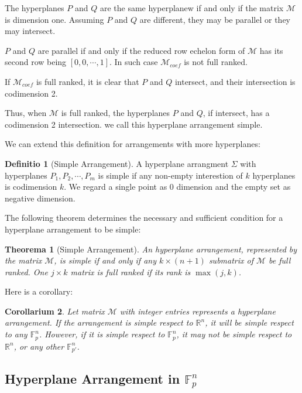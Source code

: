 \documentclass[12pt, a4paper]{article}
\newtheorem{theorem}{Theorema}[subsection]
\newtheorem{corollary}[theorem]{Corollarium}
\theoremstyle{definition}
\newtheorem{definition}{Definitio}[section]
\theoremstyle{remark}
\newcommand{\bb}[1]{\mathbb{#1}}
\begin{document}
The hyperplanes $P$ and $Q$ are the same hyperplanew if and only if the matrix $\mathcal{M}$ is dimension one. Assuming $P$ and $Q$ are different, they may be parallel or they may intersect. 

$P$ and $Q$ are parallel if and only if the reduced row echelon form of $\mathcal{M}$ has its second row being $[0, 0, \cdots, 1]$. In such case $\mathcal{M}_{coef}$ is not full ranked. 

If $\mathcal{M}_{coef}$ is full ranked, it is clear that $P$ and $Q$ intersect, and their intersection is codimension 2.

Thus, when $\mathcal{M}$ is full ranked, the hyperplanes $P$ and $Q$, if intersect, has a codimension 2 intersection. we call this hyperplane arrangement simple. 

We can extend this definition for arrangements with more hyperplanes:

\begin{definition}[Simple Arrangement]
A hyperplane arrangment $\Sigma$ with hyperplanes $P_1, P_2, \cdots, P_m$ is simple if any non-empty interestion of $k$ hyperplanes is codimension $k$.
We regard a single point as 0 dimension and the empty set as negative dimension.
\end{definition}

The following theorem determines the necessary and sufficient condition for a hyperplane arrangement to be simple:

\begin{theorem}[Simple Arrangement]
	An hyperplane arrangement, represented by the matrix $\mathcal{M}$, is simple if and only if any $k \times (n+1) $ submatrix of $\mathcal{M}$ be full ranked. One $j \times  k$ matrix is full ranked if its rank is $\max(j,k)$.
\end{theorem}

Here is a corollary:

\begin{corollary}
	Let matrix $\mathcal{M}$ with integer entries represents a hyperplane arrangement.
	If the arrangement is simple respect to $\bb{R}^n$, it will be simple respect to any $\mathbb{F}_p^n$. 
	However, if it is simple respect to $\mathbb{F}_p^n$, it may not be simple respect to $\bb{R}^n$, or any other $\mathbb{F}_{p'}^n$.
\end{corollary}

\subsection{Hyperplane Arrangement in $\mathbb{F}_p^n$}
\end{document}
